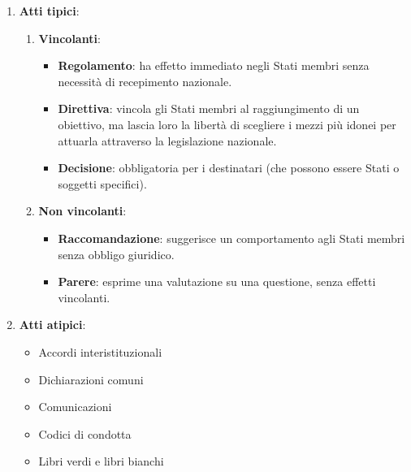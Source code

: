 \documentclass[10pt,oneside,a4paper]{article}
\begin{document}
	\begin{enumerate}
		\item \textbf{Atti tipici}:
		\begin{enumerate}
			\item \textbf{Vincolanti}:
			\begin{itemize}
				\item \textbf{Regolamento}: ha effetto immediato negli Stati membri senza necessità di recepimento nazionale.
				\item \textbf{Direttiva}: vincola gli Stati membri al raggiungimento di un obiettivo, ma lascia loro la libertà di scegliere i mezzi più idonei per attuarla attraverso la legislazione nazionale.
				\item \textbf{Decisione}: obbligatoria per i destinatari (che possono essere Stati o soggetti specifici).
			\end{itemize}
			\item \textbf{Non vincolanti}:
			\begin{itemize}
				\item \textbf{Raccomandazione}: suggerisce un comportamento agli Stati membri senza obbligo giuridico.
				\item \textbf{Parere}: esprime una valutazione su una questione, senza effetti vincolanti.
			\end{itemize}
		\end{enumerate}
		\item \textbf{Atti atipici}:  
		\begin{itemize}
			\item Accordi interistituzionali
			\item Dichiarazioni comuni
			\item Comunicazioni
			\item Codici di condotta
			\item Libri verdi e libri bianchi
		\end{itemize}
	\end{enumerate}
\end{document}
